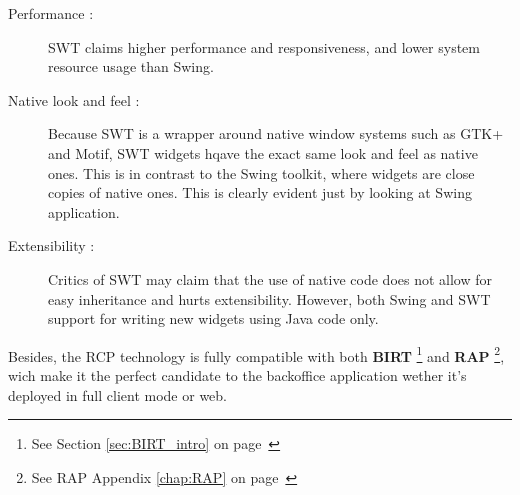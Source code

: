 \begin{description}
  \item[Performance :] SWT claims higher performance and responsiveness, and
lower system resource usage than Swing.
  \item[Native look and feel :] Because SWT is a wrapper around native window
systems such as GTK+ and Motif, SWT widgets hqave the exact same look and feel
as native ones. This is in contrast to the Swing toolkit, where widgets are
close copies of native ones. This is clearly evident just by looking at Swing
application.
  \item[Extensibility :] Critics of SWT may claim that the use of native code
does not allow for easy inheritance and hurts extensibility. However, both
Swing and SWT support for writing new widgets using Java code only.
\end{description}

Besides, the RCP technology is fully compatible with both \textbf{BIRT}
\footnote{See Section \ref{sec:BIRT_intro} on page~\pageref{sec:BIRT_intro}} and
\textbf{RAP} \footnote{See RAP Appendix \ref{chap:RAP} on
page~\pageref{chap:RAP}}, wich make it the perfect candidate to the backoffice
application wether it's deployed in full client mode or web.
